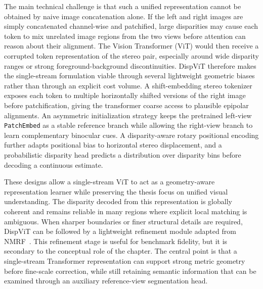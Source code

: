 The main technical challenge is that such a unified representation cannot be obtained by naive image concatenation alone.
If the left and right images are simply concatenated channel-wise and patchified, large disparities may cause each token to mix unrelated image regions from the two views before attention can reason about their alignment.
The Vision Transformer (ViT) would then receive a corrupted token representation of the stereo pair, especially around wide disparity ranges or strong foreground-background discontinuities.
DispViT therefore makes the single-stream formulation viable through several lightweight geometric biases rather than through an explicit cost volume.
A shift-embedding stereo tokenizer exposes each token to multiple horizontally shifted versions of the right image before patchification, giving the transformer coarse access to plausible epipolar alignments.
An asymmetric initialization strategy keeps the pretrained left-view {\tt PatchEmbed} as a stable reference branch while allowing the right-view branch to learn complementary binocular cues.
A disparity-aware rotary positional encoding further adapts positional bias to horizontal stereo displacement, and a probabilistic disparity head predicts a distribution over disparity bins before decoding a continuous estimate.

These designs allow a single-stream ViT to act as a geometry-aware representation learner while preserving the thesis focus on unified visual understanding.
The disparity decoded from this representation is globally coherent and remains reliable in many regions where explicit local matching is ambiguous.
When sharper boundaries or finer structural details are required, DispViT can be followed by a lightweight refinement module adapted from NMRF~\cite{guan2024neural}.
This refinement stage is useful for benchmark fidelity, but it is secondary to the conceptual role of the chapter.
The central point is that a single-stream Transformer representation can support strong metric geometry before fine-scale correction, while still retaining semantic information that can be examined through an auxiliary reference-view segmentation head.

